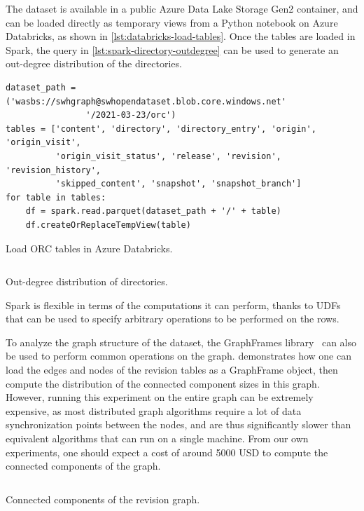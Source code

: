 The dataset is available in a public Azure Data Lake Storage Gen2 container,
and can be loaded directly as temporary views from a Python notebook on Azure
Databricks, as shown in \cref{lst:databricks-load-tables}.
Once the tables are loaded in Spark, the query in
\cref{lst:spark-directory-outdegree} can be used to generate an
out-degree distribution of the directories.

\begin{listing}
\begin{verbatim}
dataset_path = ('wasbs://swhgraph@swhopendataset.blob.core.windows.net'
                '/2021-03-23/orc')
tables = ['content', 'directory', 'directory_entry', 'origin', 'origin_visit',
          'origin_visit_status', 'release', 'revision', 'revision_history',
          'skipped_content', 'snapshot', 'snapshot_branch']
for table in tables:
    df = spark.read.parquet(dataset_path + '/' + table)
    df.createOrReplaceTempView(table)
\end{verbatim}
\caption{Load ORC tables in Azure Databricks.}%
\label{lst:databricks-load-tables}
\end{listing}

\begin{listing}
    \inputminted{sql}{codesamples/graph-dataset/spark-degree.sql}
    \caption{Out-degree distribution of directories.}%
    \label{lst:spark-directory-outdegree}
\end{listing}

Spark is flexible in terms of the computations it can perform, thanks to
\glspl{UDF}~\cite{armbrust2015spark} that can be used to specify
arbitrary operations to be performed on the rows.

To analyze the graph structure of the dataset, the GraphFrames
library~\cite{dave2016graphframes} can also be used to perform common
operations on the graph.  demonstrates how one can load the
edges and nodes of the revision tables as a GraphFrame object, then compute the
distribution of the connected component sizes in this graph. However, running
this experiment on the entire graph can be extremely expensive, as most
distributed graph algorithms require a lot of data synchronization points
between the nodes, and are thus significantly slower than equivalent algorithms
that can run on a single machine. From our own experiments, one should expect a
cost of around \num{5000} USD to compute the connected components of the graph.

\begin{listing}
    \inputminted{python}{codesamples/graph-dataset/spark-cc.py}
    \caption{Connected components of the revision graph.}%
    \label{lst:cc}
\end{listing}
